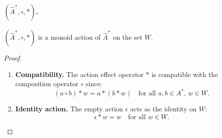 \paragraph{$(\hat{A}^{\ast}, \circ, \ast)$.}
\begin{proposition}
    $(\hat{A}^{\ast}, \circ, \ast)$ is a monoid action of $\hat{A}^{\ast}$ on the set $W$.
\end{proposition}
\begin{proof}
    \begin{enumerate}[(1)]
        \item \textbf{Compatibility.}
              The action effect operator $\ast$ is compatible with the composition operator $\circ$ since:
              \begin{equation}
                  (a \circ b) \ast w = a \ast (b \ast w) \quad \text{for all } a, b \in A^{\ast}, \, w \in W.
              \end{equation}

        \item \textbf{Identity action.}
              The empty action $\epsilon$ acts as the identity on $W$:
              \begin{equation}
                  \epsilon \ast w = w \quad \text{for all } w \in W.
              \end{equation}

    \end{enumerate}
\end{proof}


